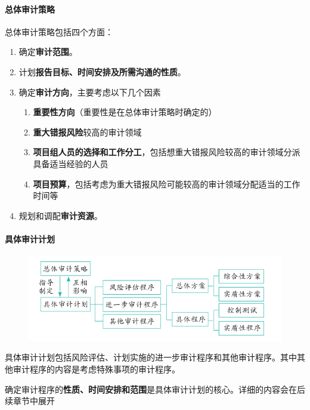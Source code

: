 \documentclass[UTF8,12pt]{ctexart}
\numberwithin{equation}{section} %
\numberwithin{figure}{section}
\numberwithin{table}{section}
\begin{document}
	\paragraph{总体审计策略}
	总体审计策略包括四个方面：
	\begin{enumerate}
		\item 确定\textbf{审计范围}。
		
		\item 计划\textbf{报告目标、时间安排及所需沟通的性质}。
		
		\item 确定\textbf{审计方向}，主要考虑以下几个因素
		\begin{enumerate}
			\item \textbf{重要性方向}（重要性是在总体审计策略时确定的）
			
			\item \textbf{重大错报风险}较高的审计领域
			
			\item \textbf{项目组人员的选择和工作分工}，包括想重大错报风险较高的审计领域分派具备适当经验的人员
			
			\item \textbf{项目预算}，包括考虑为重大错报风险可能较高的审计领域分配适当的工作时间等
		\end{enumerate}
		
		\item 规划和调配\textbf{审计资源}。
	\end{enumerate}


	
	
	
	
	\paragraph{具体审计计划}
	\begin{figure}[h!]
		\centering
		\includegraphics[width=0.7\linewidth]{screenshot001}
		\caption{}
		\label{fig:screenshot001}
	\end{figure}
	
	具体审计计划包括风险评估、计划实施的进一步审计程序和其他审计程序。其中其他审计程序的内容是考虑特殊事项的审计程序。
	
	确定审计程序的\textbf{性质、时间安排和范围}是具体审计计划的核心。详细的内容会在后续章节中展开
	
\end{document}
